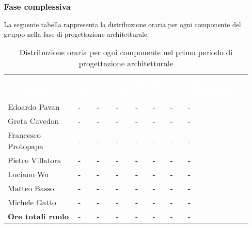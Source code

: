 \subsubsection{Fase complessiva}
La seguente tabella rappresenta la distribuzione oraria per ogni componente del gruppo nella fase di progettazione architetturale:
\begin{table}[!htbp]
\begin{center}
\renewcommand{\arraystretch}{1.25}
\begin{tabular}{ m{}<{\centering}  m{}<{\centering} m{}<{\centering} m{}<{\centering}  m{}<{\centering}  m{}<{\centering}  m{}<{\centering}  m{}<{\centering}   }
	\rowcolor{darkblue}
	\textcolor{white}{\textbf{Componente}} &\textcolor{white}{\textbf{Re}}&\textcolor{white}{\textbf{Ad}}&\textcolor{white}{\textbf{An}}&\textcolor{white}{\textbf{Pt}}&\textcolor{white}{\textbf{Pr}}&\textcolor{white}{\textbf{Ve}}&\textcolor{white}{\textbf{Ore complessive}}\\ 

	Edoardo Pavan & - & - & - & - & - & - & -\\	

	\rowcolor{gray!10} Greta Cavedon & - & - & - & - & - & - & -\\
	
	Francesco Protopapa & - & - & - & - & - & - & -\\
	
	\rowcolor{gray!10} Pietro Villatora & - & - & - & - & - & - & -\\
	
	Luciano Wu & - & - & - & - & - & - & -\\
	
	\rowcolor{gray!10} Matteo Basso & - & - & - & - & - & - & -\\
	
	Michele Gatto & - & - & - & - & - & - & -\\
	
	\rowcolor{gray!10} \textbf{Ore totali ruolo} & - & - & - & - & - & - & -\\

\end{tabular}
\caption{Distribuzione oraria per ogni componente nel primo periodo di progettazione architetturale}
\end{center}
\end{table}

